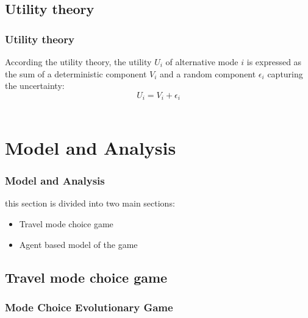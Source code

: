 \documentclass[aspectratio=169]{beamer}
\begin{document}
\subsection{Utility theory}

\begin{frame}
  \frametitle{Utility theory}   %
According the utility theory, the utility $U_i$ of alternative mode $i$ is expressed as the sum of a deterministic component $V_i$ and a random component $\epsilon_i$ capturing the uncertainty:
 \begin{equation}
U_i = V_i + \epsilon_i
\end{equation}\\

\end{frame}
\section{Model and Analysis}
\begin{frame}
	\frametitle{Model and Analysis}
	this section is divided into two main sections:
	\begin{itemize}
  \item<1-> Travel mode choice game
  \item<2-> Agent based model of the game
 
  \end{itemize}
\end{frame}
\subsection{Travel mode choice game}
\begin{frame}
  \frametitle{Mode Choice Evolutionary Game}   %
  
\end{frame}
\end{document}
